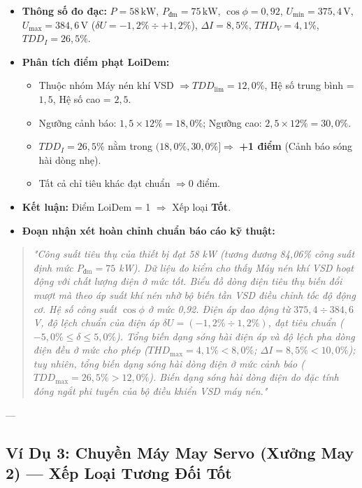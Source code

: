 \documentclass[12pt,a4paper]{article}
\begin{document}
\begin{itemize}
  \item \textbf{Thông số đo đạc:} $P = 58\,\mathrm{kW}$, $P_{\text{đm}} = 75\,\mathrm{kW}$, $\cos\phi = 0{,}92$, $U_{\min} = 375{,}4\,\mathrm{V}$, $U_{\max} = 384{,}6\,\mathrm{V}$ ($\delta U = -1{,}2\% \div +1{,}2\%$), $\Delta I = 8{,}5\%$, $THD_V = 4{,}1\%$, $TDD_I = 26{,}5\%$.
  \item \textbf{Phân tích điểm phạt LoiDem:}
  \begin{itemize}
    \item Thuộc nhóm Máy nén khí VSD $\Rightarrow TDD_{\mathrm{lim}} = 12{,}0\%$, Hệ số trung bình = $1{,}5$, Hệ số cao = $2{,}5$.
    \item Ngưỡng cảnh báo: $1{,}5 \times 12\% = 18{,}0\%$; Ngưỡng cao: $2{,}5 \times 12\% = 30{,}0\%$.
    \item $TDD_I = 26{,}5\%$ nằm trong $(18{,}0\%, 30{,}0\%] \Rightarrow$ \textbf{+1 điểm} (Cảnh báo sóng hài dòng nhẹ).
    \item Tất cả chỉ tiêu khác đạt chuẩn $\Rightarrow 0$ điểm.
  \end{itemize}
  \item \textbf{Kết luận:} Điểm LoiDem = 1 $\Rightarrow$ Xếp loại \textbf{\color{darkgreen}Tốt}.
  \item \textbf{Đoạn nhận xét hoàn chỉnh chuẩn báo cáo kỹ thuật:}
\end{itemize}

\begin{quote}\itshape
"Công suất tiêu thụ của thiết bị đạt 58 kW (tương đương 84,06\% công suất định mức $P_{\text{đm}} = 75$ kW). Dữ liệu đo kiểm cho thấy Máy nén khí VSD hoạt động với chất lượng điện ở mức tốt. Biểu đồ dòng điện tiêu thụ biến đổi mượt mà theo áp suất khí nén nhờ bộ biến tần VSD điều chỉnh tốc độ động cơ. Hệ số công suất $\cos\phi$ ở mức 0,92. Điện áp dao động từ $375{,}4 \div 384{,}6$ V, độ lệch chuẩn của điện áp $\delta U = (-1{,}2\% \div 1{,}2\%)$, đạt tiêu chuẩn ($-5{,}0\% \le \delta \le 5{,}0\%$). Tổng biến dạng sóng hài điện áp và độ lệch pha dòng điện đều ở mức cho phép ($THD_{\max} = 4{,}1\% < 8{,}0\%$; $\Delta I = 8{,}5\% < 10{,}0\%$); tuy nhiên, tổng biến dạng sóng hài dòng điện ở mức cảnh báo ($TDD_{\max} = 26{,}5\% > 12{,}0\%$). Biến dạng sóng hài dòng điện do đặc tính đóng ngắt phi tuyến của bộ điều khiển VSD máy nén."
\end{quote}

---

\subsection{Ví Dụ 3: Chuyền Máy May Servo (Xưởng May 2) --- Xếp Loại Tương Đối Tốt}
\end{document}
